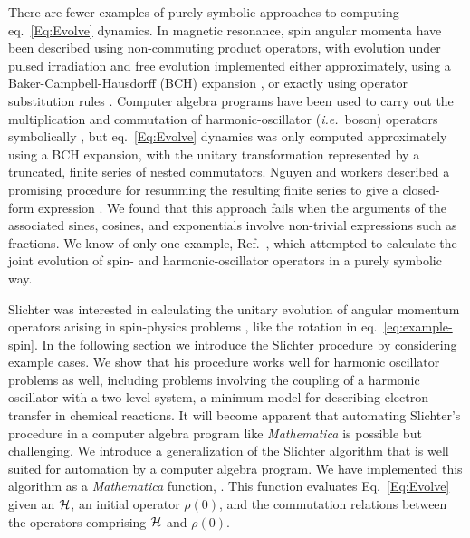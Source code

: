 There are fewer examples of purely symbolic approaches to computing eq.~\ref{Eq:Evolve} dynamics.
In magnetic resonance, spin angular momenta have been described using non-commuting product operators, with evolution under pulsed irradiation and free evolution implemented either approximately, using a Baker-Campbell-Hausdorff (BCH) expansion \cite{Filip2010nov}, or exactly using operator substitution rules \cite{Shriver1991oct,Kanters1993jan,Guntert1993jan,Guntert2006aug}.
Computer algebra programs have been used to carry out the multiplication and commutation of harmonic-oscillator (\emph{i.e.}\ boson) operators symbolically \cite{Beskrovnyi1998jun,Nguyen1998dec,Zitko2011oct}, but eq.~\ref{Eq:Evolve} dynamics was only computed approximately using a BCH expansion, with the unitary transformation represented by a truncated, finite series of nested commutators.
Nguyen and workers described a promising procedure for resumming the resulting finite series to give a closed-form expression \cite{Nguyen1998dec}.
We found that this approach fails when the arguments of the associated sines, cosines, and exponentials involve non-trivial expressions such as fractions.
We know of only one example, Ref.~, which attempted to calculate the joint evolution of spin- and harmonic-oscillator operators in a purely symbolic way.

Slichter was interested in calculating the unitary evolution of angular momentum operators arising in spin-physics problems \cite{Slichter1990}, like the rotation in eq.~\ref{eq:example-spin}.  In the following section we introduce the Slichter procedure by considering example cases.  We show that his procedure works well for harmonic oscillator problems as well, including problems involving the coupling of a harmonic oscillator with a two-level system, a minimum model for describing electron transfer in chemical reactions.  It will become apparent that automating Slichter's procedure in a computer algebra program like \emph{Mathematica} is possible but challenging.  We introduce a generalization of the Slichter algorithm that is well suited for automation by a computer algebra program.  We have implemented this algorithm as a \emph{Mathematica} function, .  This function evaluates Eq.~\ref{Eq:Evolve} given an ${\cal H}$, an initial operator $\rho(0)$, and the commutation relations between the operators comprising ${\cal H}$ and $\rho(0)$.



